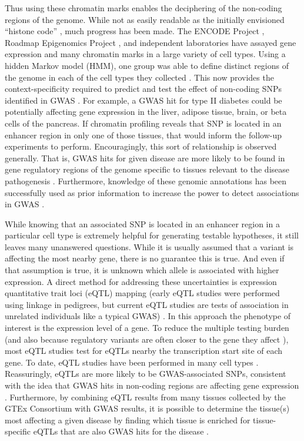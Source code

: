 Thus using these chromatin marks enables the deciphering of the
non-coding regions of the genome. While not as easily readable as the
initially envisioned ``histone code'' \citep{Jenuwein2001}, much
progress has been made. The ENCODE Project \citep{ENCODE2004,
  ENCODE2007, ENCODE2012, Ho2014, Kellis2014}, Roadmap Epigenomics
Project \citep{Roadmap2015}, and independent laboratories
\citep{Mikkelsen2007} have assayed gene expression and many chromatin
marks in a large variety of cell types. Using a hidden Markov model
(HMM), one group was able to define distinct regions of the genome in
each of the cell types they collected \citep{Ernst2011}. This now
provides the context-specificity required to predict and test the
effect of non-coding SNPs identified in GWAS \citep{Trynka2013}. For
example, a GWAS hit for type II diabetes could be potentially
affecting gene expression in the liver, adipose tissue, brain, or beta
cells of the pancreas. If chromatin profiling reveals that SNP is
located in an enhancer region in only one of those tissues, that would
inform the follow-up experiments to perform. Encouragingly, this sort
of relationship is observed generally. That is, GWAS hits for given
disease are more likely to be found in gene regulatory regions of the
genome specific to tissues relevant to the disease pathogenesis
\citep{Ernst2011, Trynka2013, Farh2015, Roadmap2015}. Furthermore,
knowledge of these genomic annotations has been successfully used as
prior information to increase the power to detect associations in GWAS
\citep{Pickrell2014, Wang2016}.

While knowing that an associated SNP is located in an enhancer region
in a particular cell type is extremely helpful for generating testable
hypotheses, it still leaves many unanswered questions. While it is
usually assumed that a variant is affecting the most nearby gene,
there is no guarantee this is true. And even if that assumption is
true, it is unknown which allele is associated with higher
expression. A direct method for addressing these uncertainties is
expression quantitative trait loci (eQTL) mapping (early eQTL studies
were performed using linkage in pedigrees, but current eQTL studies
are tests of association in unrelated individuals like a typical GWAS)
\citep{Monks2004, Duan2008, Franke2009, Lappalainen2015, Pai2015}. In
this approach the phenotype of interest is the expression level of a
gene. To reduce the multiple testing burden (and also because
regulatory variants are often closer to the gene they affect
\citep{Battle2014}), most eQTL studies test for eQTLs nearby the
transcription start site of each gene. To date, eQTL studies have been
performed in many cell types \citep{Nica2011, GTEx2015}. Reassuringly,
eQTLs are more likely to be GWAS-associated SNPs, consistent with the
idea that GWAS hits in non-coding regions are affecting gene
expression \citep{Emilsson2008, Nica2010, Nicolae2010, Raj2013,
  GTEx2015}. Furthermore, by combining eQTL results from many tissues
collected by the GTEx Consortium \citep{GTEx2013} with GWAS results,
it is possible to determine the tissue(s) most affecting a given
disease by finding which tissue is enriched for tissue-specific eQTLs
that are also GWAS hits for the disease \citep{Ongen2016}.

